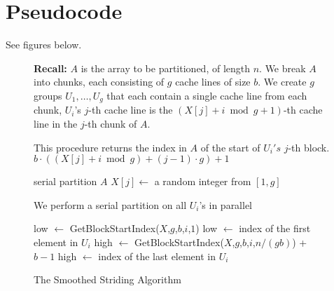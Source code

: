 \documentclass[twoside,leqno,twocolumn]{article}
\begin{document}
\section{Pseudocode}\label{sec:pseudocode}
See figures below.
\begin{figure*}
  \caption{The Smoothed Striding Algorithm}
  \label{alg:parallelPartition_smoothedStriding}
  \begin{algorithmic}%
    \State \textbf{Recall:} 
    \State $A$ is the array to be partitioned, of length $n$. 
    \State We break $A$ into chunks, each consisting of $g$ cache lines of size $b$.
    \State We create $g$ groups $U_1,\ldots, U_g$ that each contain a single cache line from each chunk,
    \State $U_i$'s $j$-th cache line is the $(X[j]+i \bmod g + 1)$-th cache line in the $j$-th chunk of $A$.
    \State

      \Comment This procedure returns the index in $A$ of the start of $U_i's$ $j$-th block.
      \State\Return $b\cdot ((X[j] + i \bmod g) +(j-1)\cdot g)+1$
    \EndProcedure
    \State

        \State serial partition $A$
      \Else
          \State $X[j] \gets$ a random integer from $[1,g]$ 
        \EndFor

         \Comment We perform a serial partition on all $U_i$'s in parallel

          \State low $\gets$ GetBlockStartIndex($X$,$g$,$b$,$i$,$1$)
          \Comment low $\gets$ index of the first element in $U_i$
          \State high $\gets$ GetBlockStartIndex($X$,$g$,$b$,$i$,$n/(gb)$) + $b-1$
          \Comment high $\gets$ index of the last element in $U_i$


\end{algorithmic}
\end{figure*}
\end{document}
